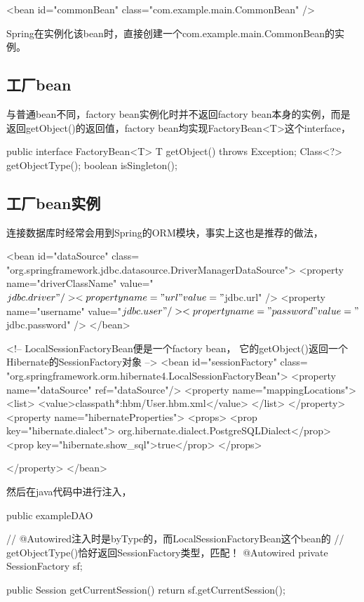 \documentclass[a4paper,11pt]{article}
\begin{document}
\begin{xmlcode}
<bean id="commonBean" class="com.example.main.CommonBean" />
\end{xmlcode}

Spring在实例化该bean时，直接创建一个com.example.main.CommonBean的实例。

\subsection[工厂bean]{工厂bean}
与普通bean不同，factory bean实例化时并不返回factory bean本身的实例，而是
返回getObject()的返回值，factory bean均实现FactoryBean<T>这个interface，

\begin{javacode}
public interface FactoryBean<T> {
  T getObject() throws Exception;
  Class<?> getObjectType();
  boolean isSingleton();
}
\end{javacode}

\subsection[工厂bean实例]{工厂bean实例}
连接数据库时经常会用到Spring的ORM模块，事实上这也是推荐的做法，

\begin{xmlcode}
<bean id="dataSource" class=
      "org.springframework.jdbc.datasource.DriverManagerDataSource">
    <property name="driverClassName" value="${jdbc.driver}" />
    <property name="url" value="${jdbc.url}" />
    <property name="username" value="${jdbc.user}" />
    <property name="password" value="${jdbc.password}" />
</bean>

<!-- LocalSessionFactoryBean便是一个factory bean，
     它的getObject()返回一个Hibernate的SessionFactory对象 -->
<bean id="sessionFactory" class=
      "org.springframework.orm.hibernate4.LocalSessionFactoryBean">
    <property name="dataSource" ref="dataSource"/>
    <property name="mappingLocations">
        <list>
            <value>classpath*:hbm/User.hbm.xml</value>
        </list>
    </property>
    <property name="hibernateProperties">
        <props>
            <prop key="hibernate.dialect">
                org.hibernate.dialect.PostgreSQLDialect</prop>
            <prop key="hibernate.show_sql">true</prop>
        </props>

    </property>
</bean>
\end{xmlcode}

然后在java代码中进行注入，

\begin{javacode}
public exampleDAO {
  // @Autowired注入时是byType的，而LocalSessionFactoryBean这个bean的
  // getObjectType()恰好返回SessionFactory类型，匹配！
  @Autowired
  private SessionFactory sf;

  public Session getCurrentSession() {
    return sf.getCurrentSession();
  }
}
\end{javacode}
\end{document}
